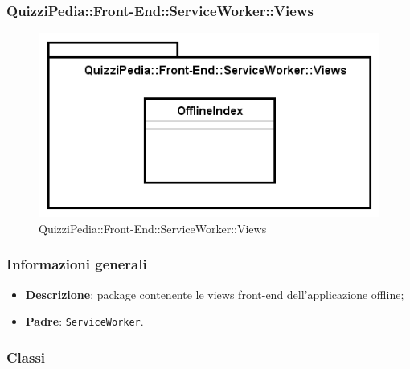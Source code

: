 \newpage
\subsubsection[QuizziPedia::Front-End::ServiceWorker::Views]{QuizziPedia::Front-End::ServiceWorker::Views}
\begin{figure} [ht]
	\centering
	\includegraphics[scale=0.80]{UML/Package/QuizziPedia_Front-End_ServiceWorker_Views.png}
	\caption{QuizziPedia::Front-End::ServiceWorker::Views}
\end{figure} \FloatBarrier

\subsubsection{Informazioni generali}
\begin{itemize}
	\item \textbf{Descrizione}: package contenente le views front-end dell'applicazione offline;
	\item \textbf{Padre}: \texttt{ServiceWorker}.
\end{itemize}
\subsubsection{Classi}




